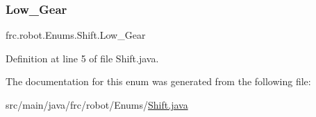 \subsubsection{\texorpdfstring{Low\+\_\+\+Gear}{Low\_Gear}}
{\footnotesize\ttfamily frc.\+robot.\+Enums.\+Shift.\+Low\+\_\+\+Gear}



Definition at line 5 of file Shift.\+java.



The documentation for this enum was generated from the following file\+:\begin{DoxyCompactItemize}
\item 
src/main/java/frc/robot/\+Enums/\hyperlink{_shift_8java}{Shift.\+java}\end{DoxyCompactItemize}
